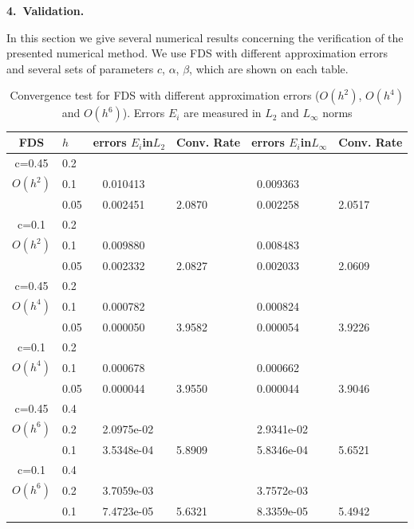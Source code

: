 \documentclass[leqno,11pt]{book}
\newcommand{\sect}[1]{\bigskip \par {\large\bf #1}}
\begin{document}
\bigskip

\sect{4.~Validation.}\label{validation}

In this section we give several numerical results concerning the verification of  the presented numerical method. 
 We use FDS with different approximation errors and several sets  of  parameters $c$, $\alpha$, $\beta$,  which are shown on each table. 


\begin{center}
\begin{table}[ht]
\centering
		\begin{tabular}{||c|l|ll|ll||}
			\hline
			\hline
      FDS       & $h$ &errors $E_i$in$L_2$&Conv. Rate& errors $E_i$in$L_\infty$&Conv. Rate\\
   			\hline 
					\hline 
      c=0.45    &0.2    &             &            &           &   \\
   $O(h^2)$     &0.1    &~ 0.010413  &            &~0.009363 &   \\
                &0.05   &~ 0.002451  &2.0870  &~0.002258 & 2.0517 \\
               	 \hline 
     c=0.1      &0.2   &             &           &                & \\
     $O(h^2)$   &0.1   &~ 0.009880  &             &~0.008483      &    \\
                &0.05  &~ 0.002332 & 2.0827       &~0.002033      & 2.0609  \\
			\hline
			\hline 	
      c=0.45    &0.2   &            &            &             &    \\
       $O(h^4)$ &0.1   &~ 0.000782   &           &~0.000824  &   \\
                &0.05  &~ 0.000050 & 3.9582    &~0.000054  & 3.9226  \\
					  			\hline 	
     c=0.1      &0.2  &            &               &               &     \\
     $O(h^4)$  &0.1   &~ 0.000678  &              &~0.000662      &        \\
               &0.05  &~ 0.000044 &3.9550        &~0.000044 &  3.9046        \\
			\hline
    \hline
   c=0.45       &0.4   &            &        &                  &      \\
     $O(h^6)$   &0.2   &~ 2.0975e-02 &           &~2.9341e-02      &       \\
     &0.1  &~ 3.5348e-04 &5.8909  &~5.8346e-04 & 5.6521         \\
	  \hline
   c=0.1       &0.4   &             &        &               &        \\
     $O(h^6)$  &0.2   &~ 3.7059e-03  &        &~3.7572e-03     &       \\
   &0.1  &~ 7.4723e-05 &5.6321  &~8.3359e-05&   5.4942       \\
	   \hline
			\hline 
		\end{tabular}
		\caption{Convergence test for  FDS with different approximation errors ($O(h^{2})$, $O(h^{4})$ and $O(h^{6})$). Errors $E_i$ are measured in $L_2$ and $L_\infty$ norms}

\label{tab:a}
\end{table}
\end{center}
\end{document}
